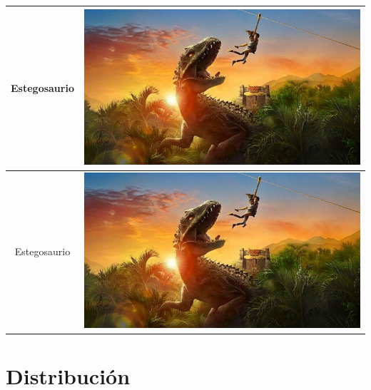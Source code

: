 \documentclass[12pt]{article} %
\begin{document}
\begin{table}[h]
\begin{center}
\begin{tabular}{| c | c |}
				Estegosaurio & \includegraphics[scale=0.3]{intro.png}  \\ \hline
				Estegosaurio & \includegraphics[scale=0.3]{intro.png}  \\ \hline
			\end{tabular}
		\end{center}
	\end{table}

	\newpage
	\section{Distribución}
	
\end{document}
